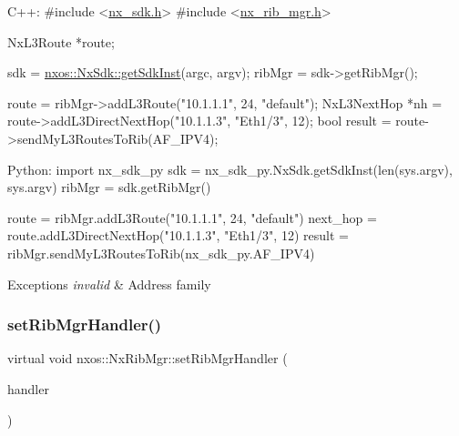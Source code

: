 \begin{DoxyCode}
C++:
\textcolor{preprocessor}{     #include <\mbox{\hyperlink{nx__sdk_8h}{nx\_sdk.h}}>}
\textcolor{preprocessor}{     #include <\mbox{\hyperlink{nx__rib__mgr_8h}{nx\_rib\_mgr.h}}>}

     NxL3Route    *route;

     sdk = \mbox{\hyperlink{classnxos_1_1_nx_sdk_a5050e2d26c40744b4fc7862068a83f39}{nxos::NxSdk::getSdkInst}}(argc, argv);
     ribMgr = sdk->getRibMgr();

     route = ribMgr->addL3Route(\textcolor{stringliteral}{"10.1.1.1"}, 24, \textcolor{stringliteral}{"default"});
     NxL3NextHop *nh = route->addL3DirectNextHop(\textcolor{stringliteral}{"10.1.1.3"}, 
                                                 \textcolor{stringliteral}{"Eth1/3"}, 12);
     \textcolor{keywordtype}{bool} result = route->sendMyL3RoutesToRib(AF\_IPV4);

Python:
     \textcolor{keyword}{import} nx\_sdk\_py
     sdk = nx\_sdk\_py.NxSdk.getSdkInst(len(sys.argv), sys.argv)
     ribMgr = sdk.getRibMgr()

     route = ribMgr.addL3Route(\textcolor{stringliteral}{"10.1.1.1"}, 24, \textcolor{stringliteral}{"default"})
     next\_hop = route.addL3DirectNextHop(\textcolor{stringliteral}{"10.1.1.3"}, \textcolor{stringliteral}{"Eth1/3"}, 12)
     result = ribMgr.sendMyL3RoutesToRib(nx\_sdk\_py.AF\_IPV4)
\end{DoxyCode}



\begin{DoxyExceptions}{Exceptions}
{\em invalid} & Address family \\
\hline
\end{DoxyExceptions}
\mbox{\label{classnxos_1_1_nx_rib_mgr_ac42dd29e34f9c508614733dbec518b99}} 
\subsubsection{\texorpdfstring{set\+Rib\+Mgr\+Handler()}{setRibMgrHandler()}}
{\footnotesize\ttfamily virtual void nxos\+::\+Nx\+Rib\+Mgr\+::set\+Rib\+Mgr\+Handler (\begin{DoxyParamCaption}\item[{\mbox{\hyperlink{classnxos_1_1_nx_rib_mgr_handler}{Nx\+Rib\+Mgr\+Handler}} $\ast$}]{handler }\end{DoxyParamCaption})\hspace{0.3cm}{\ttfamily [pure virtual]}}

